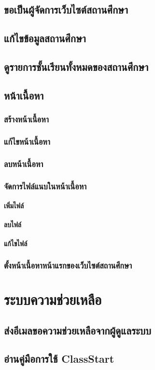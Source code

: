 \documentclass[12pt,oneside]{book}
\begin{document}
\section{ขอเป็นผู้จัดการเว็บไซต์สถานศึกษา}

\section{แก้ไขข้อมูลสถานศึกษา}

\section{ดูรายการชั้นเรียนทั้งหมดของสถานศึกษา}

\section{หน้าเนื้อหา}

\subsection{สร้างหน้าเนื้อหา}

\subsection{แก้ไขหน้าเนื้อหา}

\subsection{ลบหน้าเนื้อหา}

\subsection{จัดการไฟล์แนบในหน้าเนื้อหา}

\subsubsection{เพิ่มไฟล์}

\subsubsection{ลบไฟล์}

\subsubsection{แก้ไขไฟล์}

\subsection{ตั้งหน้าเนื้อหาหน้าแรกของเว็บไซต์สถานศึกษา}

\chapter{ระบบความช่วยเหลือ}

\section{ส่งอีเมลขอความช่วยเหลือจากผู้ดูแลระบบ}

\section{อ่านคู่มือการใช้ ClassStart}
\end{document}
